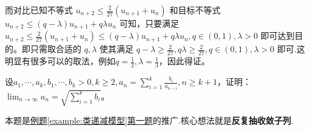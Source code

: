 \documentclass[../../main.tex]{subfiles}%
\begin{document}
\begin{note}
\begin{enumerate}
而对比已知不等式 \(u_{n + 2}\leqslant  \frac{2}{27}(u_{n + 1}+u_n)\) 和目标不等式 \(u_{n + 2}\leqslant  (q - \lambda)u_{n + 1}+q\lambda u_n\) 可知，只要满足 \(u_{n + 2}\leqslant  \frac{2}{27}(u_{n + 1}+u_n)\leqslant  (q - \lambda)u_{n + 1}+q\lambda u_n,q\in(0,1),\lambda>0\) 即可达到目的。即只需取合适的 \(q,\lambda\) 使其满足 \(q - \lambda\geqslant  \frac{2}{27},q\lambda\geqslant  \frac{2}{27},q\in(0,1),\lambda>0\) 即可.这明显有很多可以的取法，例如\(q=\frac{1}{2},\lambda=\frac{1}{3}\)，因此得证。
\end{enumerate}
\end{note}

\begin{example}
设\(a_1,\cdots,a_k,b_1,\cdots,b_k>0,k\geqslant 2,a_n = \sum_{i = 1}^{k}\frac{b_i}{a_{n - i}},n\geqslant  k + 1\)，证明：\(\lim_{n\rightarrow\infty}a_n=\sqrt{\sum_{i = 1}^{k}b_i}\)。
\end{example}
\begin{note}
本题是\hyperref[example:类递减模型]{例题\ref{example:类递减模型}第一题}的推广.核心想法就是\textbf{反复抽收敛子列}.
\end{note}
\end{document}
